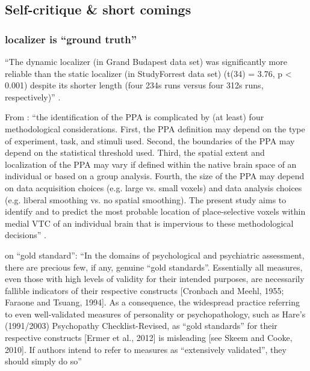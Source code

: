 \subsection{Self-critique \& short comings}


\subsubsection{localizer is ``ground truth''}

%
``The dynamic localizer (in Grand Budapest data set) was significantly more
reliable than the static localizer (in StudyForrest data set) (t(34) = 3.76, p <
0.001) despite its shorter length (four 234s runs versus four 312s runs,
respectively)'' \citep{jiahui2020predicting}.

%
From \citep{weiner2018defining}: ``the identification of the PPA is complicated
by (at least) four methodological considerations. First, the PPA definition may
depend on the type of experiment, task, and stimuli used. Second, the boundaries
of the PPA may depend on the statistical threshold used. Third, the spatial
extent and localization of the PPA may vary if defined within the native brain
space of an individual or based on a group analysis. Fourth, the size of the PPA
may depend on data acquisition choices (e.g. large vs. small voxels) and data
analysis choices (e.g. liberal smoothing vs. no spatial smoothing). The present
study aims to identify and to predict the most probable location of
place-selective voxels within medial VTC of an individual brain that is
impervious to these methodological decisions'' \citep{weiner2018defining}.

%
\citet{lilienfeld2015fifty} on ``gold standard'': ``In the domains of
psychological and psychiatric assessment, there are precious few, if any,
genuine ``gold standards''. Essentially all measures, even those with high
levels of validity for their intended purposes, are necessarily fallible
indicators of their respective constructs [Cronbach and Meehl, 1955; Faraone and
Tsuang, 1994]. As a consequence, the widespread practice referring to even
well-validated measures of personality or psychopathology, such as Hare’s
(1991/2003) Psychopathy Checklist-Revised, as ``gold standards'' for their
respective constructs [Ermer et al., 2012] is misleading [see Skeem and Cooke,
2010]. If authors intend to refer to measures as ``extensively validated'', they
should simply do so'' \citep{lilienfeld2015fifty}

